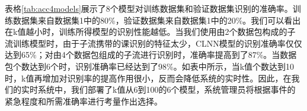 表格\ref{tab:acc4models}展示了8个模型对训练数据集和验证数据集识别的准确率。训练数据集来自数据集1中的80\%，验证数据集来自数据集1中的20\%。我们可以看出在k值越小时，训练所得模型的识别性能越低。当我们使用由2个数据包构成的子流训练模型时，由于子流携带的课识别的特征太少，CLNN模型的识别准确率仅仅达到65\%；对由4个数据包组成的子流进行识别时，准确率提高到了87\%。当数据包个数达到6个时，识别准确率已经达到了98\%。如表中所示，当k值个数达到10时，k值再增加对识别率的提高作用很小，反而会降低系统的实时性。因此，在我们的实时系统中，我们部署了k值从6到100的6个模型，系统管理员将根据事件的紧急程度和所需准确率进行考量作出选择。
